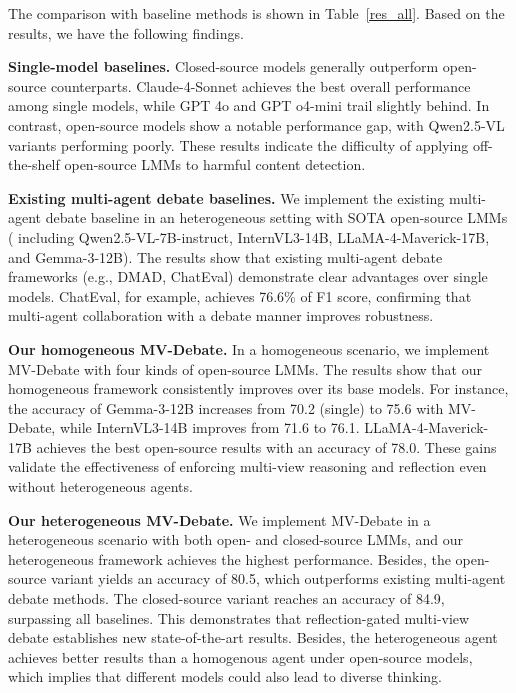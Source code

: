 \documentclass[letterpaper]{article} %
\begin{document}
The comparison with baseline methods is shown in Table~\ref{res_all}. Based on the results, we have the following findings.


\textbf{Single-model baselines.} Closed-source models generally outperform open-source counterparts. Claude-4-Sonnet achieves the best overall performance among single models, while GPT 4o and GPT o4-mini trail slightly behind. In contrast, open-source models show a notable performance gap, with Qwen2.5-VL variants performing poorly. These results indicate the difficulty of applying off-the-shelf open-source LMMs to harmful content detection.  



\textbf{Existing multi-agent debate baselines.} 
We implement the existing multi-agent debate baseline in an 
heterogeneous
setting with SOTA open-source LMMs (
including Qwen2.5-VL-7B-instruct, InternVL3-14B,  
LLaMA-4-Maverick-17B, and
Gemma-3-12B). The results show that 
existing multi-agent debate frameworks (e.g., DMAD, ChatEval) demonstrate clear advantages over single models. ChatEval, for example, achieves 76.6\% of F1 score, confirming that multi-agent collaboration with a debate manner improves robustness.



\textbf{Our homogeneous MV-Debate.} 
In a homogeneous scenario, we implement MV-Debate with four kinds of open-source LMMs. The results show that our homogeneous framework consistently improves over its base models. For instance, the accuracy of Gemma-3-12B increases from 70.2 (single) to 75.6 with MV-Debate, while InternVL3-14B improves from 71.6 to 76.1. LLaMA-4-Maverick-17B achieves the best open-source results with an accuracy of 78.0. These gains validate the effectiveness of enforcing multi-view reasoning and reflection even without heterogeneous agents.  

\textbf{Our heterogeneous MV-Debate.} 
We implement MV-Debate in a heterogeneous scenario with both
open- and closed-source LMMs, and our heterogeneous framework achieves the highest performance. Besides, the open-source variant yields an accuracy of 80.5, which outperforms existing multi-agent debate methods.
The closed-source variant reaches an accuracy of 84.9, surpassing all baselines. This demonstrates that reflection-gated multi-view debate establishes new state-of-the-art results.  Besides, the heterogeneous agent achieves better results than a homogenous agent under open-source models, which implies that different models could also lead to diverse thinking.
\end{document}

